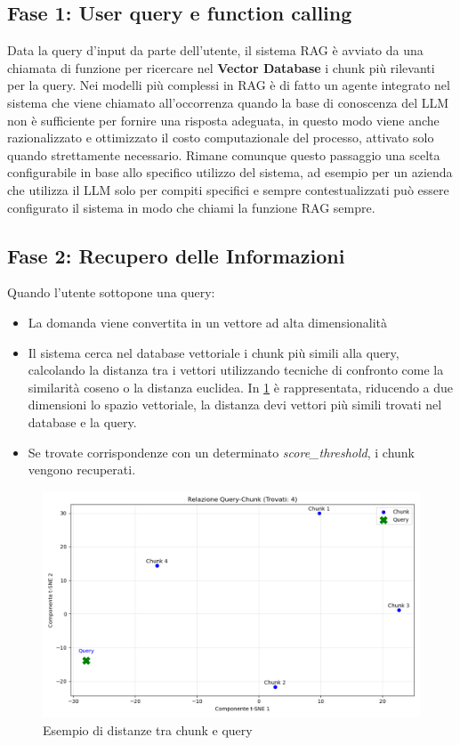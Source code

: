 \documentclass[12pt,a4paper,openright,twoside]{book}
\begin{document}
\subsection{Fase 1: User query e function calling}
Data la query d'input da parte dell'utente, il sistema RAG è avviato da una chiamata di funzione per ricercare nel
\textbf{Vector Database} i chunk più rilevanti per la query.
Nei modelli più complessi in RAG è di fatto un agente integrato nel sistema che viene chiamato all'occorrenza quando la base di conoscenza del LLM non è sufficiente per fornire una risposta adeguata,
in questo modo viene anche razionalizzato e ottimizzato il costo computazionale del processo,
attivato solo quando strettamente necessario.
Rimane comunque questo passaggio una scelta configurabile in base allo specifico utilizzo del sistema,
ad esempio per un azienda che utilizza il LLM solo per compiti specifici e sempre contestualizzati può essere configurato il sistema in modo che chiami
la funzione RAG sempre.
\subsection{Fase 2: Recupero delle Informazioni}
Quando l'utente sottopone una query:
\begin{itemize}
    \item La domanda viene convertita in un vettore ad alta dimensionalità
    \item Il sistema cerca nel database vettoriale i chunk più simili alla query, calcolando la distanza tra i vettori utilizzando tecniche di confronto come la similarità coseno o la distanza euclidea.
    In \cref{fig:Esempio distanze chunk e query} è rappresentata, riducendo a due dimensioni lo spazio vettoriale, la distanza devi vettori più simili trovati nel database e la query.
    \item Se trovate corrispondenze con un determinato \emph{score\_threshold}, i chunk vengono recuperati.
\end{itemize}

\begin{figure}[h]
    \centering
    \includegraphics[width=0.8\linewidth]{figures/plotSearch.png}
    \caption{Esempio di distanze tra chunk e query}  
    \label{fig:Esempio distanze chunk e query}
\end{figure}
\end{document}
